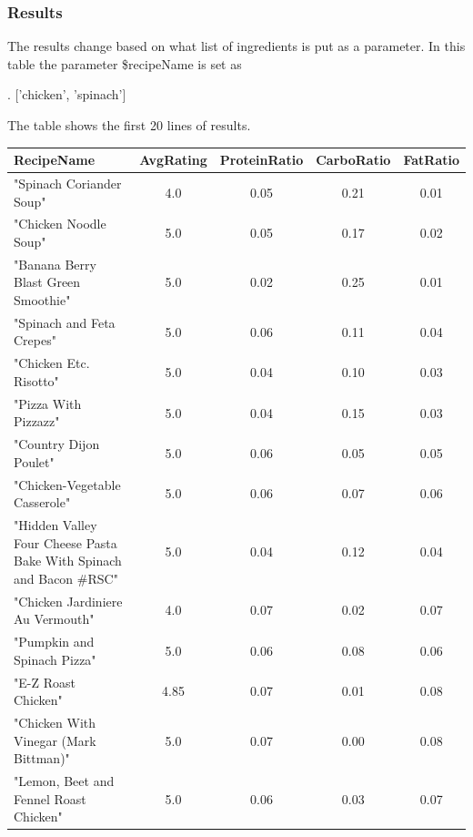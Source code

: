 \begin{enumerate}
    \subsubsection{Results}
    The results change based on what list of ingredients is put as a parameter. In this table
the parameter \$recipeName is set as 
\begin{CypherQuery}
.
['chicken', 'spinach']
\end{CypherQuery}
The table shows the first 20 lines of results.
    \begin{table}[h!]
\small %
\centering
\begin{tabularx}{\textwidth}{>{\raggedright\arraybackslash}Xcccc}
\toprule
\textbf{RecipeName} & \textbf{AvgRating} & \textbf{ProteinRatio} & \textbf{CarboRatio} & \textbf{FatRatio} \\
\midrule
"Spinach Coriander Soup"                            & 4.0  & 0.05 & 0.21 & 0.01 \\
"Chicken Noodle Soup"                               & 5.0  & 0.05 & 0.17 & 0.02 \\
"Banana Berry Blast Green Smoothie"                & 5.0  & 0.02 & 0.25 & 0.01 \\
"Spinach and Feta Crepes"                           & 5.0  & 0.06 & 0.11 & 0.04 \\
"Chicken Etc. Risotto"                              & 5.0  & 0.04 & 0.10 & 0.03 \\
"Pizza With Pizzazz"                                & 5.0  & 0.04 & 0.15 & 0.03 \\
"Country Dijon Poulet"                              & 5.0  & 0.06 & 0.05 & 0.05 \\
"Chicken-Vegetable Casserole"                       & 5.0  & 0.06 & 0.07 & 0.06 \\
"Hidden Valley Four Cheese Pasta Bake With Spinach and Bacon \#RSC" & 5.0  & 0.04 & 0.12 & 0.04 \\
"Chicken Jardiniere Au Vermouth"                   & 4.0  & 0.07 & 0.02 & 0.07 \\
"Pumpkin and Spinach Pizza"                         & 5.0  & 0.06 & 0.08 & 0.06 \\
"E-Z Roast Chicken"                                & 4.85 & 0.07 & 0.01 & 0.08 \\
"Chicken With Vinegar (Mark Bittman)"              & 5.0  & 0.07 & 0.00 & 0.08 \\
"Lemon, Beet and Fennel Roast Chicken"             & 5.0  & 0.06 & 0.03 & 0.07 \\

\end{tabularx}
\end{table}
\end{enumerate}
